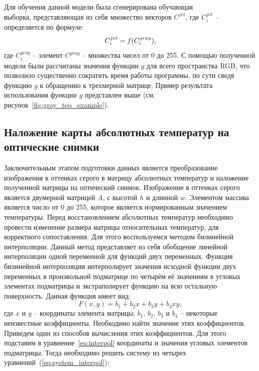 \documentclass[14pt, a4paper]{extreport}
\begin{document}
	Для обучения данной модели была сгенерирована обучающая \\ выборка, представляющая из себя множество векторов $C^{jet}$, где $C^{jet}_{i}$ -- определяется по формуле:
	\vspace*{-0.3cm}
	\begin{equation}
		C^{jet}_{i} = f(C^{gray}_{i}),
		\label{eq:Cjetgray}
		\vspace*{-0.35cm}
	\end{equation}
	где $C^{gray}_{i}$ -- элемент $C^{gray}$ -- множества чисел от 0 до 255. С помощью полученной модели были рассчитаны значения функции $g$ для всего пространства RGB, что позволило существенно сократить время работы программы, по сути сведя функцию $g$ к обращению к трехмерной матрице. Пример результата использования функции $g$ представлен выше (см. рисунок~\ref{fig:gray_tep_example}).
	
\subsection[\vspace*{-0.22cm}Наложение карты абсолютных температур на оптические \\ \hspace*{-1.15cm}снимки]{\vspace*{-0.22cm}Наложение карты абсолютных температур на \\ \hspace*{-3.75cm}оптические снимки}	
	Заключительным этапом подготовки данных является преобразование изображения в оттенках серого в матрицу абсолютных температур и наложение полученной матрицы на оптический снимок. Изображение в оттенках серого является двумерной матрицей $A$, с высотой $h$ и длинной $w$. Элементом массива является число от 0 до 255, которое является нормированным значением температуры.
	Перед восстановлением абсолютных температур необходимо провести изменение размера матрицы относительных температур, для корректного сопоставления. Для этого воспользуемся методом билинейной интерполяции. Данный метод представляет из себя обобщение линейной интерполяции одной переменной для функций двух переменных. Функция билинейной интерполяции интерполирует значения исходной функции двух переменных в произвольной подматрице по четырём её значениям в угловых элементах подматрицы и экстраполирует функцию на всю остальную поверхность. Данная функция имеет вид: 
	\begin{equation}
		F(x,y)=b_{1}+b_{2} x+b_{3} y+b_{4} x y,
		\label{eq:interpol}
	\end{equation}
	где $x$ и $y$ -- координаты элемента матрицы; $b_1$, $b_2$, $b_3$ и $b_4$ -- некоторые неизвестные коэффициенты. Необходимо найти значение этих коэффициентов. Приведем один из способов вычисления этих коэффициентов. Для этого подставим в уравнение~\ref{eq:interpol} координаты и значения угловых 
	элементов подматрицы. Тогда необходимо решить систему из четырех уравнений~(\ref{eq:system_interpol}):
	
\end{document}
